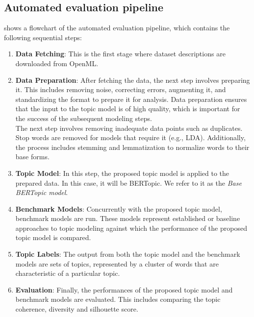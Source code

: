 \subsection{Automated evaluation pipeline}

 shows a flowchart of the automated evaluation pipeline, which contains the following sequential steps:

\begin{enumerate}

    \item \textbf{Data Fetching}: This is the first stage where dataset descriptions are downloaded from OpenML.

    \item \textbf{Data Preparation}: After fetching the data, the next step involves preparing it. This includes removing noise, correcting errors, augmenting it, and standardizing the format to prepare it for analysis. Data preparation ensures that the input to the topic model is of high quality, which is important for the success of the subsequent modeling steps. \\ The next step involves removing inadequate data points such as duplicates. Stop words are removed for models that require it (e.g., LDA). Additionally, the process includes stemming and lemmatization to normalize words to their base forms.

    \item \textbf{Topic Model}: In this step, the proposed topic model is applied to the prepared data. In this case, it will be BERTopic. We refer to it as the \textit{Base BERTopic model}.

    \item \textbf{Benchmark Models}: Concurrently with the proposed topic model, benchmark models are run. These models represent established or baseline approaches to topic modeling against which the performance of the proposed topic model is compared.

    \item \textbf{Topic Labels}: The output from both the topic model and the benchmark models are sets of topics, represented by a cluster of words that are characteristic of a particular topic.

    \item \textbf{Evaluation}: Finally, the performances of the proposed topic model and benchmark models are evaluated. This includes comparing the topic coherence, diversity and silhouette score.

\end{enumerate}

